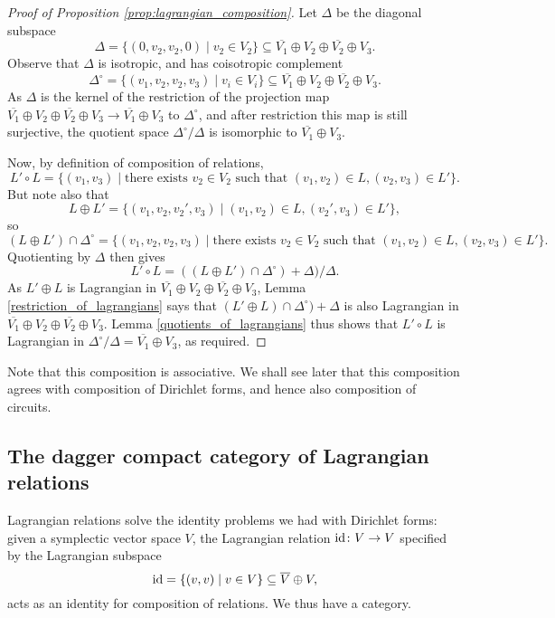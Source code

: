 \begin{proof}[Proof of Proposition \ref{prop:lagrangian_composition}]
  Let $\Delta$ be the diagonal subspace
  \[
    \Delta = \{(0,v_2,v_2,0) \mid v_2 \in V_2\} \subseteq \overline{V_1} \oplus
    V_2 \oplus \overline{V_2} \oplus V_3.
  \]
  Observe that $\Delta$ is isotropic, and has coisotropic complement
  \[
    \Delta^\circ = \{(v_1,v_2,v_2,v_3) \mid v_i \in V_i\} \subseteq
    \overline{V_1} \oplus V_2 \oplus \overline{V_2} \oplus V_3.
  \]
  As $\Delta$ is the kernel of the restriction of the projection map
  $\overline{V_1} \oplus V_2 \oplus \overline{V_2} \oplus V_3 \to \overline{V_1}
  \oplus V_3$ to $\Delta^\circ$, and after restriction this map is still
  surjective, the quotient space $\Delta^\circ/\Delta$ is isomorphic to
  $\overline{V_1} \oplus V_3$. 

  Now, by definition of composition of relations, 
  \[
    L' \circ L = \{(v_1,v_3) \mid \mbox{there exists } v_2 \in V_2 \mbox{ such
    that } (v_1,v_2) \in L, (v_2,v_3) \in L'\}.
  \]
  But note also that 
  \[
    L \oplus L'  = \{(v_1,v_2,v_2',v_3) \mid (v_1,v_2) \in L, (v_2',v_3) \in
    L'\},
  \]
  so 
  \[
    (L \oplus L')\cap \Delta^\circ = \{(v_1,v_2,v_2,v_3) \mid \mbox{there exists
    } v_2 \in V_2 \mbox{ such that } (v_1,v_2) \in L, (v_2,v_3) \in L'\}.
  \]
  Quotienting by $\Delta$ then gives
  \[
    L' \circ L = ((L \oplus L')\cap \Delta^\circ)+\Delta)/\Delta.
  \]
  As $L' \oplus L$ is Lagrangian in $\overline{V_1} \oplus V_2 \oplus
  \overline{V_2} \oplus V_3$, Lemma \ref{restriction_of_lagrangians} says that
  $(L' \oplus L)\cap \Delta^\circ)+\Delta$ is also Lagrangian in $\overline{V_1}
  \oplus V_2 \oplus \overline{V_2} \oplus V_3$. Lemma
  \ref{quotients_of_lagrangians} thus shows that $L' \circ L$ is Lagrangian in
  $\Delta^\circ/\Delta = \overline{V_1} \oplus V_3$, as required.
\end{proof}

Note that this composition is associative. We shall see later that this
composition agrees with composition of Dirichlet forms, and hence also
composition of circuits. 

\subsection{The dagger compact category of Lagrangian relations}

Lagrangian relations solve the identity problems we had with Dirichlet forms:
given a symplectic vector space $V$, the Lagrangian relation $\mathrm{id}{\colon} V \to V$
specified by the Lagrangian subspace
\[
  \mathrm{id} = \{(v,v) \mid v \in V\} \subseteq \overline{V} \oplus V,
\]
acts as an identity for composition of relations. We thus have a category.

